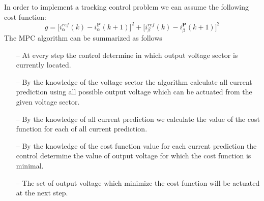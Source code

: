 \documentclass[11pt,a4paper,oneside]{book}
\numberwithin{equation}{section}
\theoremstyle{it}
\theoremstyle{definition}
\begin{document}
In order to implement a tracking control problem we can assume the following cost function:
\begin{equation}
	g=\Big[i_\alpha^{ref}(k) - i_\alpha^{\mathbf{P}}(k+1)\Big]^2+ 
	\Big[i_\beta^{ref}(k) -i_\beta^{\mathbf{P}}(k+1)\Big]^2
\end{equation}
The MPC algorithm can be summarized as follows
\begin{itemize}
	\item[--] At every step the control determine in which output voltage sector is currently located. 
	\item[--] By the knowledge of the voltage sector the algorithm calculate all current prediction using all possible output voltage which can be actuated from the given voltage sector.
	\item[--] By the knowledge of all current prediction we calculate the value of the cost function for each of all current prediction.
	\item[--] By the knowledge of the cost function value for each current prediction the control determine the value of output voltage for which the cost function is minimal.
	\item[--] The set of output voltage which minimize the cost function will be actuated at the next step.
\end{itemize}
\end{document}

